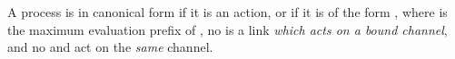 \begin{definition}\label{def:nc-canonical-forms}
  A process  is in canonical form if it is an action, or if it is of the
  form , where  is the maximum evaluation
  prefix of , no  is a link \emph{which acts on a bound channel},
  and no  and  act on the \emph{same} channel.
\end{definition}
